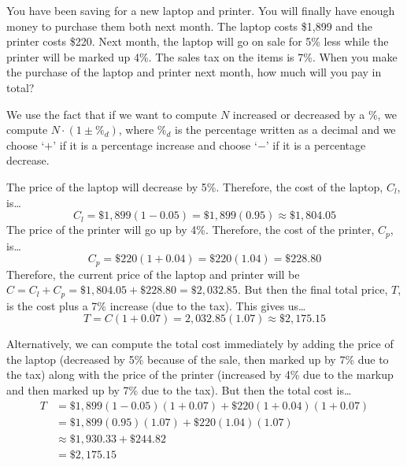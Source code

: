 \documentclass[12pt,letterpaper]{exam}
\begin{document}
\examtitle
{} 
\scores
\bottomline
\newpage

\begin{questions}

\newpage
\question[10] You have been saving for a new laptop and printer. You will finally have enough money to purchase them both next month. The laptop costs \$1,899 and the printer costs \$220. Next month, the laptop will go on sale for 5\% less while the printer will be marked up 4\%. The sales tax on the items is 7\%. When you make the purchase of the laptop and printer next month, how much will you pay in total? \pspace

\sol We use the fact that if we want to compute $N$ increased or decreased by a \%, we compute $N \cdot (1 \pm \%_d)$, where $\%_d$ is the percentage written as a decimal and we choose `$+$' if it is a percentage increase and choose `$-$' if it is a percentage decrease. \pspace

The price of the laptop will decrease by 5\%. Therefore, the cost of the laptop, $C_l$, is\dots
	\[
	C_l= \$1,\!899 (1 - 0.05)= \$1,\!899 (0.95) \approx \$1,\!804.05
	\]
The price of the printer will go up by 4\%. Therefore, the cost of the printer, $C_p$, is\dots
	\[
	C_p= \$220 (1 + 0.04)= \$220 (1.04)= \$228.80
	\]
Therefore, the current price of the laptop and printer will be $C= C_l + C_p= \$1,\!804.05 + \$228.80= \$2,\!032.85$. But then the final total price, $T$, is the cost plus a 7\% increase (due to the tax). This gives us\dots
	\[
	T= C (1 + 0.07)= 2,\!032.85(1.07) \approx \$2,\!175.15
	\] \pspace

Alternatively, we can compute the total cost immediately by adding the price of the laptop (decreased by 5\% because of the sale, then marked up by 7\% due to the tax) along with the price of the printer (increased by 4\% due to the markup and then marked up by 7\% due to the tax). But then the total cost is\dots
	\[
	\begin{aligned}
	T&= \$1,\!899(1 - 0.05)(1 + 0.07) + \$220(1 + 0.04)(1 + 0.07) \\[0.3cm]
	&= \$1,\!899(0.95)(1.07) + \$220(1.04)(1.07) \\[0.3cm]
	&\approx \$1,\!930.33 + \$244.82 \\[0.3cm]
	&= \$2,\!175.15
	\end{aligned}
	\]




\end{questions}
\end{document}
